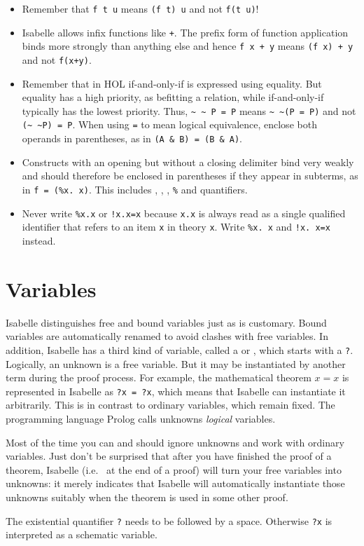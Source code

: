 \begin{itemize}
\item
Remember that \texttt{f t u} means \texttt{(f t) u} and not \texttt{f(t u)}!
\item
Isabelle allows infix functions like \texttt{+}. The prefix form of function
application binds more strongly than anything else and hence \texttt{f~x + y}
means \texttt{(f~x)~+~y} and not \texttt{f(x+y)}.
\item
Remember that in HOL if-and-only-if is expressed using equality.  But equality
has a high priority, as befitting a  relation, while if-and-only-if typically
has the lowest priority.  Thus, \verb$~ ~ P = P$ means \verb$~ ~(P = P)$ and
not \verb$(~ ~P) = P$. When using \texttt{=} to mean logical equivalence,
enclose both operands in parentheses, as in \texttt{(A \& B) = (B \& A)}.
\item
Constructs with an opening but without a closing delimiter bind very weakly
and should therefore be enclosed in parentheses if they appear in subterms, as
in \texttt{f = (\%x.~x)}. This includes
, , , \verb$%$ and quantifiers.
\item
Never write \texttt{\%x.x} or \texttt{!x.x=x} because \texttt{x.x} is always
read as a single qualified identifier that refers to an item \texttt{x} in
theory \texttt{x}. Write \texttt{\%x.~x} and \texttt{!x.~x=x} instead.
\end{itemize}

\section{Variables}
\label{sec:variables}

Isabelle distinguishes free and bound variables just as is customary. Bound
variables are automatically renamed to avoid clashes with free variables. In
addition, Isabelle has a third kind of variable, called a  or , which starts with a \texttt{?}.  Logically,
an unknown is a free variable. But it may be instantiated by another term
during the proof process. For example, the mathematical theorem $x = x$ is
represented in Isabelle as \texttt{?x = ?x}, which means that Isabelle can
instantiate it arbitrarily. This is in contrast to ordinary variables, which
remain fixed. The programming language Prolog calls unknowns {\em logical\/}
variables.

Most of the time you can and should ignore unknowns and work with ordinary
variables. Just don't be surprised that after you have finished the
proof of a theorem, Isabelle (i.e.\  at the end of a proof) will
turn your free variables into unknowns: it merely indicates that Isabelle will
automatically instantiate those unknowns suitably when the theorem is used in
some other proof.
\begin{warn}
  The existential quantifier \texttt{?} needs to be
  followed by a space. Otherwise \texttt{?x} is interpreted as a schematic
  variable.
\end{warn}

